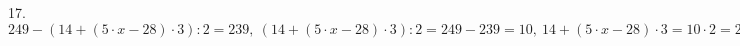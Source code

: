 17. $249-(14+(5\cdot x-28)\cdot 3):2=239,\ (14+(5\cdot x-28)\cdot 3):2=249-239=10,\ 14+(5\cdot x-28)\cdot 3=10\cdot2=20,\ (5\cdot x-28)\cdot 3=20-14=6,\
5\cdot x-28=6:3=2,\ 5\cdot x=2+28=30,\ x=30:5=6.$\\
